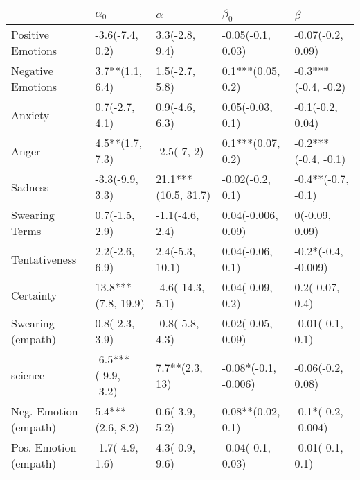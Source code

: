 \begin{tabular}{lllll}
\toprule
{} &           $\alpha_0$ &             $\alpha$ &             $\beta_0$ &              $\beta$ \\
\midrule
Positive Emotions     &      -3.6(-7.4, 0.2) &       3.3(-2.8, 9.4) &     -0.05(-0.1, 0.03) &    -0.07(-0.2, 0.09) \\
Negative Emotions     &      3.7**(1.1, 6.4) &       1.5(-2.7, 5.8) &     0.1***(0.05, 0.2) &  -0.3***(-0.4, -0.2) \\
Anxiety               &       0.7(-2.7, 4.1) &       0.9(-4.6, 6.3) &      0.05(-0.03, 0.1) &     -0.1(-0.2, 0.04) \\
Anger                 &      4.5**(1.7, 7.3) &          -2.5(-7, 2) &     0.1***(0.07, 0.2) &  -0.2***(-0.4, -0.1) \\
Sadness               &      -3.3(-9.9, 3.3) &  21.1***(10.5, 31.7) &      -0.02(-0.2, 0.1) &   -0.4**(-0.7, -0.1) \\
Swearing Terms        &       0.7(-1.5, 2.9) &      -1.1(-4.6, 2.4) &    0.04(-0.006, 0.09) &       0(-0.09, 0.09) \\
Tentativeness         &       2.2(-2.6, 6.9) &      2.4(-5.3, 10.1) &      0.04(-0.06, 0.1) &  -0.2*(-0.4, -0.009) \\
Certainty             &   13.8***(7.8, 19.9) &     -4.6(-14.3, 5.1) &      0.04(-0.09, 0.2) &      0.2(-0.07, 0.4) \\
Swearing (empath)     &       0.8(-2.3, 3.9) &      -0.8(-5.8, 4.3) &     0.02(-0.05, 0.09) &     -0.01(-0.1, 0.1) \\
science               &  -6.5***(-9.9, -3.2) &       7.7**(2.3, 13) &  -0.08*(-0.1, -0.006) &    -0.06(-0.2, 0.08) \\
Neg. Emotion (empath) &     5.4***(2.6, 8.2) &       0.6(-3.9, 5.2) &     0.08**(0.02, 0.1) &  -0.1*(-0.2, -0.004) \\
Pos. Emotion (empath) &      -1.7(-4.9, 1.6) &       4.3(-0.9, 9.6) &     -0.04(-0.1, 0.03) &     -0.01(-0.1, 0.1) \\
\bottomrule
\end{tabular}
